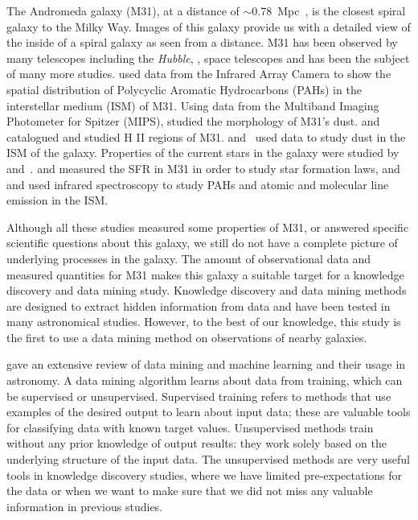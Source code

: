 The Andromeda galaxy (M31), at a distance of $\sim 0.78$~Mpc~\citep{McConnachie05}, is the closest spiral galaxy to the Milky Way.
Images of this galaxy provide us with a detailed view of the inside of a spiral galaxy as seen from a distance.
M31 has been observed by many telescopes including the {\it Hubble}, \Spitzer, \Herschel space telescopes and has been the subject of many more studies. %
\cite{Barmby06} used data from the \Spitzer Infrared Array Camera \citep[IRAC;][]{Fazio04} to show the spatial distribution of Polycyclic Aromatic Hydrocarbons (PAHs) in the interstellar medium (ISM) of M31.
Using data from the Multiband Imaging Photometer for Spitzer (MIPS), \cite{Gordon06} studied the morphology of M31's dust.
\cite{Azimlu11} and \cite{Sanders12} catalogued and studied H {\sc II} regions of M31.
\cite{Draine14, Mattsson14, Viaene14, Smith12} and~\cite{Fritz12} used \Herschel data to study dust in the ISM of the galaxy.
Properties of the current stars in the galaxy were studied by~\cite{Tamm12} and~\cite{Massey07}. %
\cite{Rahmani16, Ford13} and \cite{Tabatabaei10} measured the SFR in M31 in order to study star formation laws, and \cite{Dim15} and \cite{Kapala15} used infrared spectroscopy to study PAHs and atomic and molecular line emission in the ISM.

Although all these studies measured some properties of M31, or answered specific scientific questions about this galaxy, we still do not have a complete picture of underlying processes in the galaxy.
The amount of observational data and measured quantities for M31 makes this galaxy a suitable target for a knowledge discovery and data mining study.
Knowledge discovery and data mining methods are designed to extract hidden information from data and have been tested in many astronomical studies.
However, to the best of our knowledge, this study is the first to use a data mining method on observations of nearby galaxies. %

\cite{Ball10} gave an extensive review of data mining and machine learning and their usage in astronomy.
A data mining algorithm learns about data from training, which can be supervised or unsupervised.
Supervised training refers to methods that use examples of the desired output to learn about input data; these are valuable tools for classifying data with known target values.
Unsupervised methods train without any prior knowledge of output results: 
they work solely based on the underlying structure of the input data.   
The unsupervised methods are very useful tools in knowledge discovery studies, where we have limited pre-expectations for the data or when we want to make sure that we did not miss any valuable information in  previous studies. %

